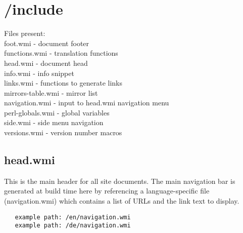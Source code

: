 \documentclass[11pt]{article}
\begin{document}
%
%

\section{/include}
Files present:\\
foot.wmi - document footer\\
functions.wmi - translation functions\\
head.wmi - document head\\
info.wmi - info snippet\\
links.wmi - functions to generate links\\
mirrors-table.wmi - mirror list\\
navigation.wmi - input to head.wmi navigation menu\\
perl-globals.wmi - global variables\\
side.wmi - side menu navigation\\
versions.wmi - version number macros\\

\subsection{head.wmi}
  This is the main header for all site documents. The main navigation bar is generated at build time here by referencing a language-specific file (navigation.wmi) which contains a list of URLs and the link text to display.
  
\begin{verbatim}
   example path: /en/navigation.wmi
   example path: /de/navigation.wmi
\end{verbatim}
  
\end{document}
